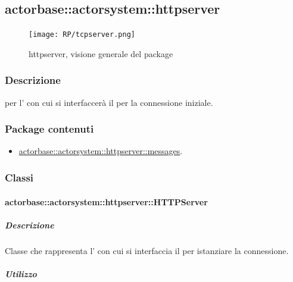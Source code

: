 \documentclass{scalatekids-article}
\begin{document}

\subsection{actorbase::actorsystem::httpserver} %
\label{sec:actorbase::actorsystem::httpserver}

\begin{figure}[H]
  \begin{center}
    \texttt{[image: RP/tcpserver.png]} %
    \caption{httpserver, visione generale del package}
  \end{center}
\end{figure}

\subsubsection{Descrizione}
 per l' con cui si interfaccerà il  per la connessione iniziale.

\subsubsection{Package contenuti}
\begin{itemize}
\item \hyperref[sec:actorbase::actorsystem::httpserver::messages]{actorbase::actorsystem::httpserver::messages}.
\end{itemize}

\subsubsection{Classi}

\paragraph{actorbase::actorsystem::httpserver::HTTPServer}
\label{sec:actorbase::actorsystem::httpserver::HTTPServer}

\subparagraph{Descrizione}
Classe che rappresenta l' con cui si interfaccia il  per
istanziare la connessione.

\subparagraph{Utilizzo}
\end{document}
